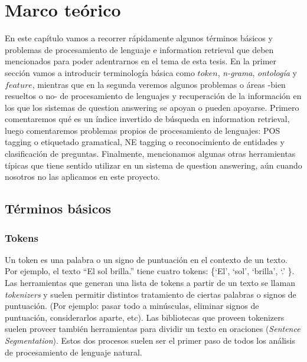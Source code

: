 \chapter{Marco teórico}
\label{chap:teorico}

En este capítulo vamos a recorrer rápidamente algunos términos básicos y problemas de procesamiento de lenguaje e information retrieval que deben  mencionados para poder adentrarnos en el tema de esta tesis. En la primer sección vamos a introducir terminología básica como $token$, \textit{n-grama}, \textit{ontología} y $feature$, mientras que en la segunda veremos algunos problemas o áreas -bien resueltos o no- de procesamiento de lenguajes y recuperación de la información en los que los sistemas de question answering se apoyan o pueden apoyarse. Primero comentaremos qué es un índice invertido de búsqueda en information retrieval, luego comentaremos problemas propios de procesamiento de lenguajes: POS tagging o etiquetado gramatical, NE tagging o reconocimiento de entidades y clasificación de preguntas. {\color{red} Finalmente, mencionamos algunas otras herramientas típicas que tiene sentido utilizar en un sistema de question answering, aún cuando nosotros no las aplicamos en este proyecto.}

\section{Términos básicos}

\subsection*{Tokens}

Un token es una palabra o un signo de puntuación en el contexto de un
texto.
Por ejemplo, el texto {\textquotedblleft}El sol
brilla.{\textquotedblright} tiene cuatro tokens:
\{{\textquoteleft}El{\textquoteright}, {\textquoteleft}sol{\textquoteright}, {\textquoteleft}brilla{\textquoteright}, {\textquoteleft}.{\textquoteright} \}. 
Las herramientas que generan una lista de tokens a partir de un texto se llaman
\textit{tokenizers} y suelen permitir distintos tratamiento de ciertas
palabras o signos de puntuación. (Por ejemplo: pasar todo a minúsculas, eliminar signos de puntuación, considerarlos aparte, etc).
Las bibliotecas que proveen tokenizers suelen proveer también herramientas para dividir un texto en
oraciones (\textit{Sentence Segmentation}). 
Estos dos procesos suelen ser el primer paso de todos los análisis de procesamiento de lenguaje natural.


